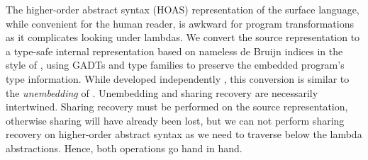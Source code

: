 The higher-order abstract syntax (HOAS\HOAS{}) representation of the surface
language, while convenient for the human reader, is awkward for program
transformations as it complicates looking under lambdas. We convert the source
representation to a type-safe internal representation based on nameless de
Bruijn indices in the style of \citet{Altenkirch:2003kz}, using GADTs
\cite{Jones:2006eh} and type families
\cite{Chakravarty:2005dx,Schrijvers:2008ir} to preserve the embedded program's
type information. While developed independently
\cite{McDonell:2013wi,Chakravarty:2009uo}, this conversion is similar to the
\emph{unembedding} of \citet{Atkey:2009dj}. Unembedding and sharing recovery are
necessarily intertwined. Sharing recovery must be performed on the source
representation, otherwise sharing will have already been lost, but we can not
perform sharing recovery on higher-order abstract syntax as we need to traverse
below the lambda abstractions. Hence, both operations go hand in hand.

